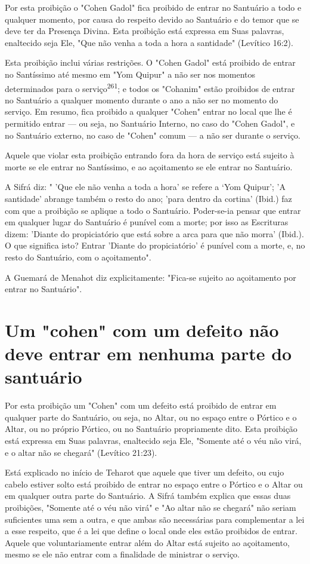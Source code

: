 \begin{itemize}
\begin{enumrate}
\begin{itemize}
\begin{itemize}
\begin{itemize}
Por esta proibição o "Cohen Gadol" fica proibido de entrar no San­tuário
a todo e qualquer momento, por causa do respeito devido ao Santuário e
do temor que se deve ter da Presença Divina. Esta proibição está
expressa em Suas palavras, enaltecido seja Ele, "Que não venha a toda a
hora a santida­de" (Levítico 16:2).

Esta proibição inclui várias restrições. O "Cohen Gadol" está proi­bido
de entrar no Santíssimo até mesmo em "Yom Quipur" a não ser nos
mo­mentos determinados para o serviço\textsuperscript{261}; e todos os
"Cohanim" estão proibi­dos de entrar no Santuário a qualquer momento
durante o ano a não ser no momento do serviço. Em resumo, fica proibido
a qualquer "Cohen" entrar no local que lhe é permitido entrar --- ou
seja, no Santuário Interno, no caso do "Cohen Gadol", e no Santuário
externo, no caso de "Cohen" comum --- a não ser durante o serviço.

Aquele que violar esta proibição entrando fora da hora de serviço está
sujeito à morte se ele entrar no Santíssimo, e ao açoitamento se ele
entrar no Santuário.

A Sifrá diz: " 'Que ele não venha a toda a hora' se refere a `Yom
Qui­pur'; 'A santidade' abrange também o resto do ano; 'para dentro da
cortina'
(Ibid.) faz com que a proibição se aplique a todo o Santuário.
Poder-se-ia pen­sar que entrar em qualquer lugar do Santuário é punível
com a morte; por isso as Escrituras dizem: 'Diante do propiciatório que
está sobre a arca para que não morra' (Ibid.). O que significa isto?
Entrar 'Diante do propiciatório' é punível com a morte, e, no resto do
Santuário, com o açoitamento".

A Guemará de Menahot diz explicitamente: "Fica-se sujeito ao
açoi­tamento por entrar no Santuário".

\section{Um "cohen" com um defeito não deve entrar em nenhuma parte do santuário}

Por esta proibição um "Cohen" com um defeito está proibido de entrar em
qualquer parte do Santuário, ou seja, no Altar, ou no espaço entre o
Pórtico e o Altar, ou no próprio Pórtico, ou no Santuário propriamente
dito. Esta proibição está expressa em Suas palavras, enaltecido seja
Ele, "Somente até o véu não virá, e o altar não se chegará" (Levítico
21:23).

Está explicado no início de Teharot que aquele que tiver um defei­to, ou
cujo cabelo estiver solto está proibido de entrar no espaço entre o
Pórti­co e o Altar ou em qualquer outra parte do Santuário. A Sifrá
também explica que essas duas proibições, "Somente até o véu não virá" e
"Ao altar não se chegará" não seriam suficientes uma sem a outra, e que
ambas são necessárias para complementar a lei a esse respeito, que é a
lei que define o local onde eles estão proibidos de entrar. Aquele que
voluntariamente entrar além do Altar es­tá sujeito ao açoitamento, mesmo
se ele não entrar com a finalidade de minis­trar o serviço.


\end{itemize}
\end{itemize}
\end{itemize}
\end{enumrate}
\end{itemize}
